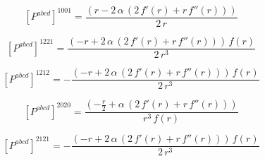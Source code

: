 \documentclass[11pt]{article}
\begin{document}
\par\smallskip
\begin{dmath*}[breakdepth={5}]
\left[P^{abcd}\right]^{1001} = \frac{\left(r - 2\,\alpha\,\left(2\,f'\!\left(r\right) + r\,f''\!\left(r\right)\right)\right)}{2\,r}
\end{dmath*}
\par\smallskip
\begin{dmath*}[breakdepth={5}]
\left[P^{abcd}\right]^{1221} = \frac{\left(-r + 2\,\alpha\,\left(2\,f'\!\left(r\right) + r\,f''\!\left(r\right)\right)\right)\,f\!\left(r\right)}{2\,{r}^{3}}
\end{dmath*}
\par\smallskip
\begin{dmath*}[breakdepth={5}]
\left[P^{abcd}\right]^{1212} = -\frac{\left(-r + 2\,\alpha\,\left(2\,f'\!\left(r\right) + r\,f''\!\left(r\right)\right)\right)\,f\!\left(r\right)}{2\,{r}^{3}}
\end{dmath*}
\par\smallskip
\begin{dmath*}[breakdepth={5}]
\left[P^{abcd}\right]^{2020} = \frac{\left(-\frac{r}{2} + \alpha\,\left(2\,f'\!\left(r\right) + r\,f''\!\left(r\right)\right)\right)}{{r}^{3}\,f\!\left(r\right)}
\end{dmath*}
\par\smallskip
\begin{dmath*}[breakdepth={5}]
\left[P^{abcd}\right]^{2121} = -\frac{\left(-r + 2\,\alpha\,\left(2\,f'\!\left(r\right) + r\,f''\!\left(r\right)\right)\right)\,f\!\left(r\right)}{2\,{r}^{3}}
\end{dmath*}
\par\smallskip
\end{document}
